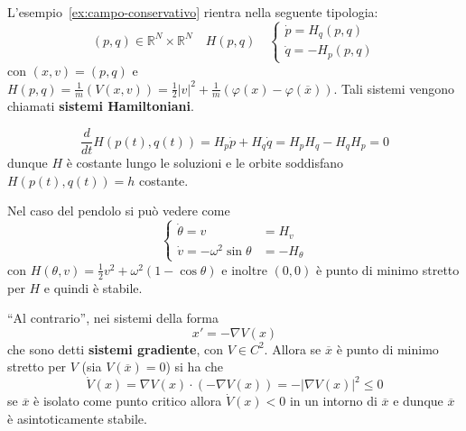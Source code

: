 L'esempio~\ref{ex:campo-conservativo} rientra nella seguente tipologia:
\[
  {(p, q)} \in \mathbb{R}^{N} \times \mathbb{R}^{N} \quad H{(p, q)} \quad
  \begin{cases}
      \dot{p} = H_q{(p, q)}\\
      \dot{q} = -H_p{(p, q)}
  \end{cases}
\]
con \({(x,v)} = {(p, q)}\) e \(H{(p, q)} = \frac{1}{m}{(V{(x,v)})} =
\frac{1}{2}|v|^2 + \frac{1}{m}{(\varphi {(x)} - \varphi {(\overline{x})})}\).
Tali sistemi vengono chiamati \textbf{sistemi Hamiltoniani}.
\begin{remark}
    \[
      \frac{d}{dt} H{(p{(t)}, q{(t)})} = H_p \dot{p} + H_q \dot{q} = H_p H_q -
      H_q H_p = 0
    \]
    dunque \(H\) è costante lungo le soluzioni e le orbite soddisfano
    \(H{(p{(t)}, q{(t)})} = h\) costante.
\end{remark}
Nel caso del pendolo si può vedere come
\[
  \begin{cases}
      \dot{\theta} = v &= H_v \\
      \dot{v} = -\omega^2 \sin\theta &= -H_{\theta} 
  \end{cases}
\]
con \(H{(\theta, v)} = \frac{1}{2}v^2 + \omega^2{(1 - \cos \theta)}\) e inoltre
\({(0,0)}\) è punto di minimo stretto per \(H\) e quindi è stabile.

``Al contrario'', nei sistemi della forma
\[
  x' = -\nabla V{(x)}
\]
che sono detti \textbf{sistemi gradiente}, con \(V \in C^2\). Allora se
\(\overline{x}\) è punto di minimo stretto per \(V\) (sia \(V{(\overline{x})} =
0\)) si ha che 
\[
  \dot{V}{(x)} = \nabla V{(x)} \cdot {(-\nabla V{(x)})} = - \left| \nabla V{(x)}
  \right| ^2 \le 0
\]
se \(\overline{x}\) è isolato come punto critico allora \(\dot{V}{(x)} < 0\) in
un intorno di \(\overline{x}\) e dunque \(\overline{x}\) è asintoticamente
stabile.

